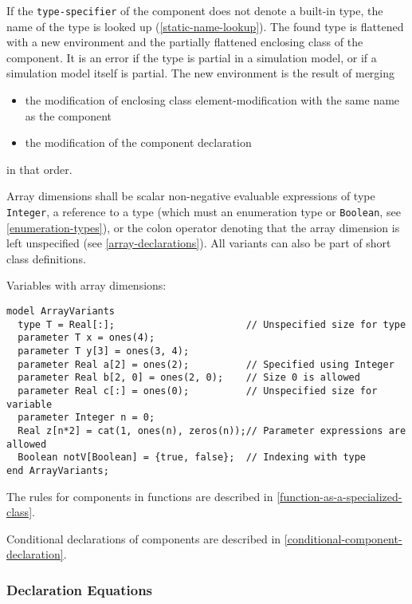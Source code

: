 If the \lstinline[language=grammar]!type-specifier! of the component does not denote a built-in type, the name of the type is looked up (\cref{static-name-lookup}).
The found type is flattened with a new environment and the partially flattened enclosing class of the component.
It is an error if the type is partial in a simulation model, or if a simulation model itself is partial.
The new environment is the result of merging
\begin{itemize}
\item
  the modification of enclosing class element-modification with the same name as the component
\item
  the modification of the component declaration
\end{itemize}
in that order.

Array dimensions shall be scalar non-negative evaluable expressions of type \lstinline!Integer!, a reference to a type (which must an enumeration type or \lstinline!Boolean!, see \cref{enumeration-types}), or the colon operator denoting that the array dimension is left unspecified (see \cref{array-declarations}).
All variants can also be part of short class definitions.

\begin{example}
Variables with array dimensions:
\begin{lstlisting}[language=modelica]
model ArrayVariants
  type T = Real[:];                       // Unspecified size for type
  parameter T x = ones(4);
  parameter T y[3] = ones(3, 4);
  parameter Real a[2] = ones(2);          // Specified using Integer
  parameter Real b[2, 0] = ones(2, 0);    // Size 0 is allowed
  parameter Real c[:] = ones(0);          // Unspecified size for variable
  parameter Integer n = 0;
  Real z[n*2] = cat(1, ones(n), zeros(n));// Parameter expressions are allowed
  Boolean notV[Boolean] = {true, false};  // Indexing with type
end ArrayVariants;
\end{lstlisting}
\end{example}

The rules for components in functions are described in \cref{function-as-a-specialized-class}.

Conditional declarations of components are described in \cref{conditional-component-declaration}.

\subsubsection{Declaration Equations}\label{declaration-equations}


